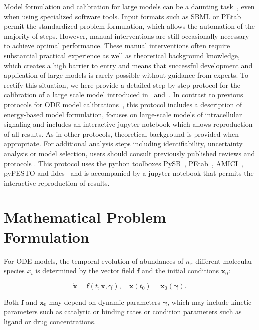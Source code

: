 \documentclass[11pt]{article}
\newcommand{\dims}[1]{{n_{#1}}}
\begin{document}
    Model formulation and calibration for large models can be a daunting
task~\cite{2754712/C7C8DJNE}, even when using specialized software
tools. Input formats such as SBML or PEtab~\cite{2754712/86CV69R2}
permit the standardized problem formulation, which allows the automation
of the majority of steps. However, manual interventions are still
occasionally necessary to achieve optimal performance. These manual
interventions often require substantial practical experience as well as
theoretical background knowledge, which creates a high barrier to entry
and means that successful development and application of large models is
rarely possible without guidance from experts. To rectify this
situation, we here provide a detailed step-by-step protocol for the
calibration of a large scale model introduced in~\cite{2754712/I4JQ4DMV}
and~\cite{2754712/Y3E9IYH8}. In contrast to previous protocols for ODE
model calibrations~\cite{2754712/3DK88XY2}, this protocol includes a
description of energy-based model formulation, focuses on large-scale
models of intracellular signaling and includes an interactive jupyter
notebook which allows reproduction of all results. As in other
protocols, theoretical background is provided when appropriate. For
additional analysis steps including identifiability, uncertainty
analysis or model selection, users should consult previously published
reviews and protocols . This protocol uses the python toolboxes PySB~\cite{2754712/7D6BBY4A},
PEtab~\cite{2754712/86CV69R2}, AMICI~\cite{2754712/HBAI2XHJ}, pyPESTO and fides~\cite{2754712/RUR9I9SQ} and is accompanied by a jupyter
notebook that permits the interactive reproduction of results.

    \hypertarget{mathematical-problem-formulation}{%
\section{Mathematical Problem
Formulation}\label{mathematical-problem-formulation}}

For ODE models, the temporal
evolution of abundances of \(\dims{x}\) different molecular species
\(x_i\) is determined by the vector field \(\textbf{f}\) and the initial
conditions \(\textbf{x}_0\):

\begin{equation}
\dot{\textbf{x}}=\textbf{f}(t,\textbf{x},\boldsymbol{\gamma}),\quad \textbf{x}(t_0) = \textbf{x}_0(\boldsymbol{\gamma}).
\label{eq:ode}
\end{equation}

Both \(\textbf{f}\) and \(\textbf{x}_0\) may depend on dynamic
parameters \(\boldsymbol{\gamma}\), which may include kinetic parameters
such as catalytic or binding rates or condition parameters such as
ligand or drug concentrations.
\end{document}

